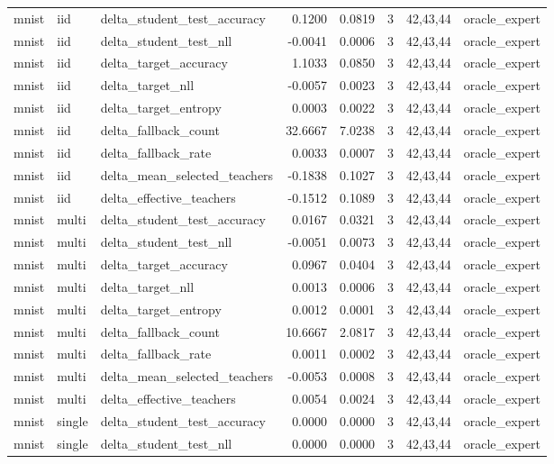 \begin{tabular}{lllrrrll}
mnist & iid & delta\_student\_test\_accuracy & 0.1200 & 0.0819 & 3 & 42,43,44 & oracle\_expert \\
mnist & iid & delta\_student\_test\_nll & -0.0041 & 0.0006 & 3 & 42,43,44 & oracle\_expert \\
mnist & iid & delta\_target\_accuracy & 1.1033 & 0.0850 & 3 & 42,43,44 & oracle\_expert \\
mnist & iid & delta\_target\_nll & -0.0057 & 0.0023 & 3 & 42,43,44 & oracle\_expert \\
mnist & iid & delta\_target\_entropy & 0.0003 & 0.0022 & 3 & 42,43,44 & oracle\_expert \\
mnist & iid & delta\_fallback\_count & 32.6667 & 7.0238 & 3 & 42,43,44 & oracle\_expert \\
mnist & iid & delta\_fallback\_rate & 0.0033 & 0.0007 & 3 & 42,43,44 & oracle\_expert \\
mnist & iid & delta\_mean\_selected\_teachers & -0.1838 & 0.1027 & 3 & 42,43,44 & oracle\_expert \\
mnist & iid & delta\_effective\_teachers & -0.1512 & 0.1089 & 3 & 42,43,44 & oracle\_expert \\
mnist & multi & delta\_student\_test\_accuracy & 0.0167 & 0.0321 & 3 & 42,43,44 & oracle\_expert \\
mnist & multi & delta\_student\_test\_nll & -0.0051 & 0.0073 & 3 & 42,43,44 & oracle\_expert \\
mnist & multi & delta\_target\_accuracy & 0.0967 & 0.0404 & 3 & 42,43,44 & oracle\_expert \\
mnist & multi & delta\_target\_nll & 0.0013 & 0.0006 & 3 & 42,43,44 & oracle\_expert \\
mnist & multi & delta\_target\_entropy & 0.0012 & 0.0001 & 3 & 42,43,44 & oracle\_expert \\
mnist & multi & delta\_fallback\_count & 10.6667 & 2.0817 & 3 & 42,43,44 & oracle\_expert \\
mnist & multi & delta\_fallback\_rate & 0.0011 & 0.0002 & 3 & 42,43,44 & oracle\_expert \\
mnist & multi & delta\_mean\_selected\_teachers & -0.0053 & 0.0008 & 3 & 42,43,44 & oracle\_expert \\
mnist & multi & delta\_effective\_teachers & 0.0054 & 0.0024 & 3 & 42,43,44 & oracle\_expert \\
mnist & single & delta\_student\_test\_accuracy & 0.0000 & 0.0000 & 3 & 42,43,44 & oracle\_expert \\
mnist & single & delta\_student\_test\_nll & 0.0000 & 0.0000 & 3 & 42,43,44 & oracle\_expert \\

\end{tabular}
